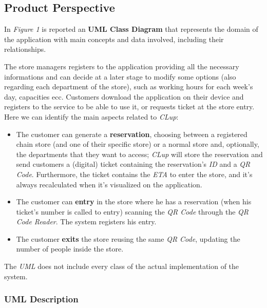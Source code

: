 \documentclass{article}
\begin{document}
	\subsection{Product Perspective}
	
	
	In \emph{Figure 1} is reported an {\bfseries UML Class Diagram} that represents the domain of the application with main concepts and data involved, including their relationships.
	
	The store managers registers to the application providing all the necessary informations and can decide at a later stage to modify some options (also regarding each department of the store), such as working hours for each week's day, capacities ecc. Customers download the application on their device and registers to the service to be able to use it, or requests ticket at the store entry. Here we can identify the main aspects related to \emph{CLup}:
	
	\begin{itemize}
		
		\item The customer can generate a {\bfseries reservation}, choosing between a registered chain store (and one of their specific store) or a normal store and, optionally, the departments that they want to access; \emph{CLup} will store the reservation and send customers a (digital) ticket containing the reservation's \emph{ID} and a \emph{QR Code}. Furthermore, the ticket contains the \emph{ETA} to enter the store, and it's always recalculated when it's visualized on the application.
		
		\item The customer can {\bfseries entry} in the store where he has a reservation (when his ticket's number is called to entry) scanning the \emph{QR Code} through the \emph{QR Code Reader}. The system registers his entry.
		
		\item The customer {\bfseries exits} the store reusing the same \emph{QR Code}, updating the number of people inside the store.
		
	\end{itemize}

	The \emph{UML} does not include every class of the actual implementation of the system.
		
		\subsubsection{UML Description}
		
\end{document}

